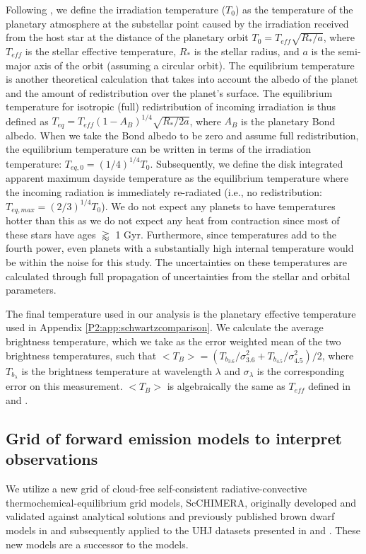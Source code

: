 Following \citet{Hansen2008}, we define the irradiation temperature ($T_0$) as the temperature of the planetary atmosphere at the  substellar point caused by the irradiation received from the host star at the distance of the planetary orbit $T_0 = T_{eff} \sqrt{R_*/a}$, where $T_{eff}$ is the stellar effective temperature, $R_*$ is the stellar radius, and $a$ is the semi-major axis of the orbit (assuming a circular orbit).
The equilibrium temperature is another theoretical calculation that takes into account the albedo of the planet and the amount of redistribution over the planet's surface. The equilibrium temperature for isotropic (full) redistribution of incoming irradiation is thus defined as $T_{eq} = T_{eff}(1-A_B)^{1/4} \sqrt{R_*/2a}$, where $A_B$ is the planetary Bond albedo. When we take the Bond albedo to be zero and assume full redistribution, the equilibrium temperature can be written in terms of the irradiation temperature: $T_{eq,\textit{0}} = (1/4)^{1/4} T_0$. Subsequently, we define the disk integrated apparent maximum dayside temperature \citep{Schwartz2017} as the equilibrium temperature where the incoming radiation is immediately re-radiated (i.e., no redistribution: $T_{eq,max} = (2/3)^{1/4} T_0$). We do not expect any planets to have temperatures hotter than this as we do not expect any heat from contraction since most of these stars have ages $\gtrapprox$ 1 Gyr. Furthermore, since temperatures add to the fourth power, even planets with a substantially high internal temperature \citep[e.g.,][]{Thorngren2019} would be within the noise for this study. The uncertainties on these temperatures are calculated through full propagation of uncertainties from the stellar and orbital parameters.

The final temperature used in our analysis is the planetary effective temperature used in Appendix \ref{P2:app:schwartzcomparison}. We calculate the average brightness temperature, which we take as the error weighted mean of the two brightness temperatures, such that $<T_B> = (T_{b_{3.6}}/ \sigma_{3.6}^2 +  T_{b_{4.5}}/\sigma_{4.5}^2) / 2 $, where $T_{b_{\lambda}}$ is the brightness temperature at wavelength $\lambda$ and $\sigma_{\lambda}$ is the corresponding error on this measurement. $<T_B>$ is algebraically the same as $T_{eff}$ defined in \citet{Schwartz2015} and \citet{Cowan2011b}.


\subsection{Grid of forward emission models to interpret observations}
\label{P2:sec:models}
We utilize a new grid of cloud-free self-consistent radiative-convective thermochemical-equilibrium grid models, ScCHIMERA, originally developed and validated against analytical solutions and previously published brown dwarf models in \citet{Piskorz2018} and subsequently applied to the UHJ datasets presented in \citet{Arcangeli2018, Mansfield2018a} and \citet{Kreidberg2018b}. These new models are a successor to the \citet{Fortney2008} models.

